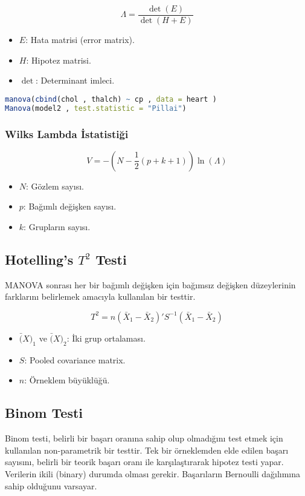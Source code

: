 \[ \Lambda = \frac{\det(E)}{\det(H + E)} \]

\begin{itemize}
	\item $E$: Hata matrisi (error matrix).
	\item $H$: Hipotez matrisi.
	\item $\det$: Determinant imleci.
\end{itemize}

\begin{lstlisting}[language=R]
manova(cbind(chol , thalch) ~ cp , data = heart )
Manova(model2 , test.statistic = "Pillai")
\end{lstlisting}

\subsubsection{Wilks Lambda İstatistiği}

\[ V = -\left( N - \frac{1}{2}(p + k + 1) \right) \ln(\Lambda) \]

\begin{itemize}
	\item $N$: Gözlem sayısı.
	\item $p$: Bağımlı değişken sayısı.
	\item $k$: Grupların sayısı.
\end{itemize}


\newpage

\subsection{Hotelling's $T^2$ Testi}
MANOVA sonrası her bir bağımlı değişken için bağımsız değişken düzeylerinin farklarını belirlemek amacıyla kullanılan bir testtir.

\[ T^2 = n (\bar{X}_1 - \bar{X}_2)' S^{-1} (\bar{X}_1 - \bar{X}_2) \]

\begin{itemize}
	\item $\bar(X)_1$ ve $\bar(X)_2$: İki grup ortalaması.
	\item $S$: Pooled covariance matrix.
	\item $n$: Örneklem büyüklüğü.
\end{itemize}

\newpage

\subsection{Binom Testi}
Binom testi, belirli bir başarı oranına sahip olup olmadığını test etmek için kullanılan non-parametrik bir testtir. Tek bir örneklemden elde edilen başarı sayısını, belirli bir teorik başarı oranı ile karşılaştırarak hipotez testi yapar. Verilerin ikili (binary) durumda olması gerekir. Başarıların Bernoulli dağılımına sahip olduğunu varsayar.

